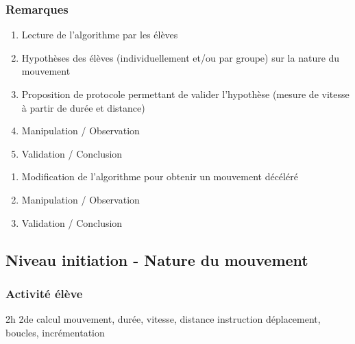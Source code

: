 \subsubsection{Remarques}

\begin{minipage}[t]{0.5\linewidth}
\begin{methode}
    \begin{enumerate}
        \item Lecture de l'algorithme par les élèves
        \item Hypothèses des élèves (individuellement et/ou par groupe) sur la nature du mouvement
        \item Proposition de protocole permettant de valider l'hypothèse (mesure de vitesse à partir de durée et distance)
        \item Manipulation / Observation
        \item Validation / Conclusion
    \end{enumerate}
\end{methode}
\end{minipage}
\hfill
\begin{minipage}[t]{0.5\linewidth}
\begin{methode}
    \begin{enumerate}
        \item Modification de l'algorithme pour obtenir un mouvement décéléré
        \item Manipulation / Observation
        \item Validation / Conclusion
    \end{enumerate}
\end{methode}
\end{minipage}

%
%

\newpage

\subsection{Niveau initiation - Nature du mouvement}

\subsubsection{Activité élève}

\cartouche
{2h}         %
{2de}         %
{calcul}        %
{mouvement, durée, vitesse, distance}     %
{instruction déplacement, boucles, incrémentation}       %


